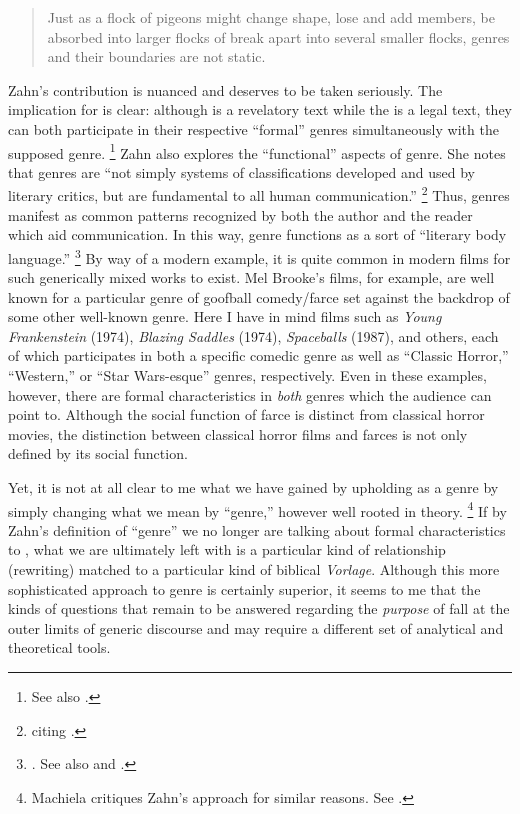 \begin{quote}
    Just as a flock of pigeons might change shape, lose and add members, be absorbed into larger flocks of break apart into several smaller flocks, genres and their boundaries are not static.%
    \autocite[277]{zahn_jbl2012}
\end{quote} 
\noindent
Zahn's contribution is nuanced and deserves to be taken seriously. The implication for \rwb is clear: although \jub is a revelatory text while the \templescroll is a legal text, they can both participate in their respective ``formal'' genres simultaneously with the supposed \rwb genre.%
    \footnote{%
        See also \cite{fraade_goldstein-etal2017}.}
Zahn also explores the ``functional'' aspects of genre. She notes that genres are ``not simply systems of classifications developed and used by literary critics, but are fundamental to all human communication.''%
    \footnote{%
        \Cite[280]{zahn_jbl2012} citing 
        \cite[37-53]{fowler2002}.}
Thus, genres manifest as common patterns recognized by both the author and the reader which aid communication. In this way, genre functions as a sort of ``literary body language.''%
    \footnote{%
        \Cite[276]{zahn_jbl2012}. See also 
        \cite[199]{newsom_grossman2010} and 
        \cite[37-53]{fowler2002}.}
By way of a modern example, it is quite common in modern films for such generically mixed works to exist. Mel Brooke's films, for example, are well known for a particular genre of goofball comedy/farce set against the backdrop of some other well-known genre. Here I have in mind films such as \emph{Young Frankenstein} (1974), \emph{Blazing Saddles} (1974), \emph{Spaceballs} (1987), and others, each of which participates in both a specific comedic genre as well as ``Classic Horror,'' ``Western,'' or ``Star Wars-esque'' genres, respectively. Even in these examples, however, there are formal characteristics in \emph{both} genres which the audience can point to. Although the social function of farce is distinct from classical horror movies, the distinction between classical horror films and farces is not only defined by its social function. 

Yet, it is not at all clear to me what we have gained by upholding \rwb as a genre by simply changing what we mean by ``genre,'' however well rooted in theory.%
    \footnote{%
        Machiela critiques Zahn's approach for similar reasons. See 
        \cite{machiela_jjs2010}.}
If by Zahn's definition of ``genre'' we no longer are talking about formal characteristics to \rwb, what we are ultimately left with is a particular kind of relationship (rewriting) matched to a particular kind of biblical \emph{Vorlage}. Although this more sophisticated approach to genre is certainly superior, it seems to me that the kinds of questions that remain to be answered regarding the \emph{purpose} of \rwb fall at the outer limits of generic discourse and may require a different set of analytical and theoretical tools.



